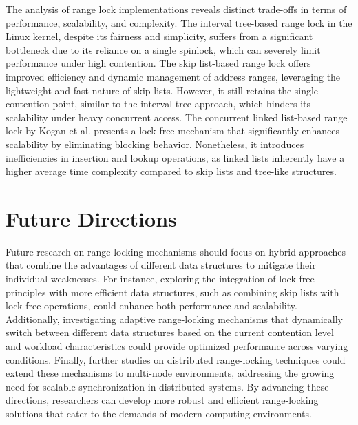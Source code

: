 The analysis of range lock implementations reveals distinct trade-offs in terms of performance, scalability, and complexity. The interval tree-based range lock in the Linux kernel, despite its fairness and simplicity, suffers from a significant bottleneck due to its reliance on a single spinlock, which can severely limit performance under high contention. The skip list-based range lock offers improved efficiency and dynamic management of address ranges, leveraging the lightweight and fast nature of skip lists. However, it still retains the single contention point, similar to the interval tree approach, which hinders its scalability under heavy concurrent access. The concurrent linked list-based range lock by Kogan et al. presents a lock-free mechanism that significantly enhances scalability by eliminating blocking behavior. Nonetheless, it introduces inefficiencies in insertion and lookup operations, as linked lists inherently have a higher average time complexity compared to skip lists and tree-like structures.

\section{Future Directions}

Future research on range-locking mechanisms should focus on hybrid approaches that combine the advantages of different data structures to mitigate their individual weaknesses. For instance, exploring the integration of lock-free principles with more efficient data structures, such as combining skip lists with lock-free operations, could enhance both performance and scalability. Additionally, investigating adaptive range-locking mechanisms that dynamically switch between different data structures based on the current contention level and workload characteristics could provide optimized performance across varying conditions. Finally, further studies on distributed range-locking techniques could extend these mechanisms to multi-node environments, addressing the growing need for scalable synchronization in distributed systems. By advancing these directions, researchers can develop more robust and efficient range-locking solutions that cater to the demands of modern computing environments.
